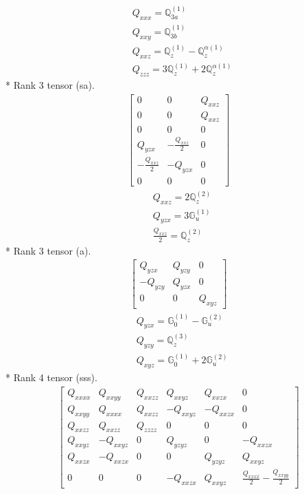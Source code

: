 \documentclass[fleqn,8pt,landscape]{jsarticle}
\begin{document}
\begin{align*}
& Q_{xxx} = \mathbb{Q}_{3a}^{(1)} \\
& Q_{xxy} = \mathbb{Q}_{3b}^{(1)} \\
& Q_{xxz} = \mathbb{Q}_{z}^{(1)} - \mathbb{Q}_{z}^{\alpha(1)} \\
& Q_{zzz} = 3 \mathbb{Q}_{z}^{(1)} + 2 \mathbb{Q}_{z}^{\alpha(1)}
\end{align*}
* Rank 3 tensor (sa).
\begin{align*}
\begin{bmatrix} 0 & 0 & Q_{xxz} \\ 0 & 0 & Q_{xxz} \\ 0 & 0 & 0 \\ Q_{yzx} & - \frac{Q_{xxz}}{2} & 0 \\ - \frac{Q_{xxz}}{2} & - Q_{yzx} & 0 \\ 0 & 0 & 0 \end{bmatrix}
\end{align*}
\begin{align*}
& Q_{xxz} = 2 \mathbb{Q}_{z}^{(2)} \\
& Q_{yzx} = 3 \mathbb{G}_{u}^{(1)} \\
& \frac{Q_{xxz}}{2} = \mathbb{Q}_{z}^{(2)}
\end{align*}
* Rank 3 tensor (a).
\begin{align*}
\begin{bmatrix} Q_{yzx} & Q_{yzy} & 0 \\ - Q_{yzy} & Q_{yzx} & 0 \\ 0 & 0 & Q_{xyz} \end{bmatrix}
\end{align*}
\begin{align*}
& Q_{yzx} = \mathbb{G}_{0}^{(1)} - \mathbb{G}_{u}^{(2)} \\
& Q_{yzy} = \mathbb{Q}_{z}^{(3)} \\
& Q_{xyz} = \mathbb{G}_{0}^{(1)} + 2 \mathbb{G}_{u}^{(2)}
\end{align*}
* Rank 4 tensor (sss).
\begin{align*}
\begin{bmatrix} Q_{xxxx} & Q_{xxyy} & Q_{xxzz} & Q_{xxyz} & Q_{xxzx} & 0 \\ Q_{xxyy} & Q_{xxxx} & Q_{xxzz} & - Q_{xxyz} & - Q_{xxzx} & 0 \\ Q_{xxzz} & Q_{xxzz} & Q_{zzzz} & 0 & 0 & 0 \\ Q_{xxyz} & - Q_{xxyz} & 0 & Q_{yzyz} & 0 & - Q_{xxzx} \\ Q_{xxzx} & - Q_{xxzx} & 0 & 0 & Q_{yzyz} & Q_{xxyz} \\ 0 & 0 & 0 & - Q_{xxzx} & Q_{xxyz} & \frac{Q_{xxxx}}{2} - \frac{Q_{xxyy}}{2} \end{bmatrix}
\end{align*}
\end{document}
